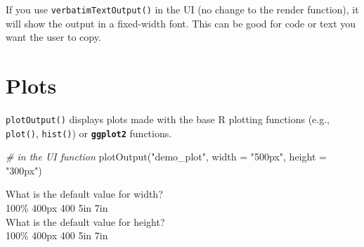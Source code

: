 \documentclass[
  oneside]{book}
\newenvironment{Shaded}{\begin{snugshade}}{\end{snugshade}}
\newcommand{\AttributeTok}[1]{\textcolor[rgb]{0.77,0.63,0.00}{#1}}
\newcommand{\CommentTok}[1]{\textcolor[rgb]{0.56,0.35,0.01}{\textit{#1}}}
\newcommand{\FunctionTok}[1]{\textcolor[rgb]{0.00,0.00,0.00}{#1}}
\newcommand{\NormalTok}[1]{#1}
\newcommand{\OtherTok}[1]{\textcolor[rgb]{0.56,0.35,0.01}{#1}}
\newcommand{\SpecialCharTok}[1]{\textcolor[rgb]{0.00,0.00,0.00}{#1}}
\newcommand{\StringTok}[1]{\textcolor[rgb]{0.31,0.60,0.02}{#1}}
\begin{document}
If you use \texttt{verbatimTextOutput}\texttt{()} in the UI (no change to the render function), it will show the output in a fixed-width font. This can be good for code or text you want the user to copy.

\begin{Shaded}
\end{Shaded}

\hypertarget{plots}{%
\section{Plots}\label{plots}}

\texttt{plotOutput}\texttt{()} displays plots made with the base R plotting functions (e.g., \texttt{plot}\texttt{()}, \texttt{hist}\texttt{()}) or \textbf{\texttt{ggplot2}} functions.

\begin{Shaded}
\begin{Highlighting}[]
\CommentTok{\# in the UI function}
\FunctionTok{plotOutput}\NormalTok{(}\StringTok{"demo\_plot"}\NormalTok{, }\AttributeTok{width =} \StringTok{"500px"}\NormalTok{, }\AttributeTok{height =} \StringTok{"300px"}\NormalTok{)}
\end{Highlighting}
\end{Shaded}

What is the default value for \AttributeTok{width}?\\
100\% 400px 400 5in 7in\\
What is the default value for \AttributeTok{height}?\\
100\% 400px 400 5in 7in
\end{document}
